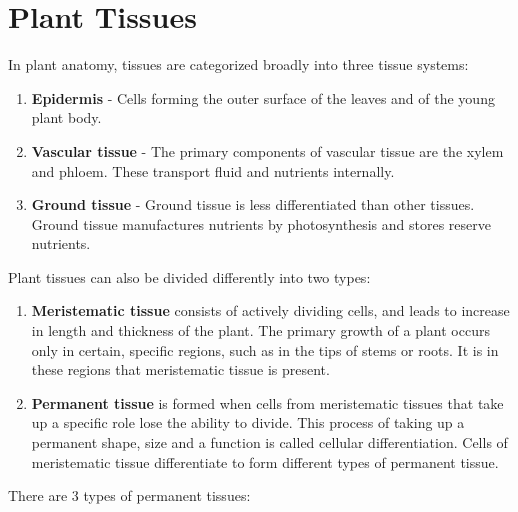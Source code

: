 \section{Plant Tissues}\label{plant-tissues}

In plant anatomy, tissues are categorized broadly into three tissue
systems:

\begin{enumerate}
\def\labelenumi{\arabic{enumi}.}
\tightlist
\item
  \textbf{Epidermis} - Cells forming the outer surface of the leaves and
  of the young plant body.
\item
  \textbf{Vascular tissue} - The primary components of vascular tissue
  are the xylem and phloem. These transport fluid and nutrients
  internally.
\item
  \textbf{Ground tissue} - Ground tissue is less differentiated than
  other tissues. Ground tissue manufactures nutrients by photosynthesis
  and stores reserve nutrients.
\end{enumerate}

Plant tissues can also be divided differently into two types:

\begin{enumerate}
\def\labelenumi{\arabic{enumi}.}
\tightlist
\item
  \textbf{Meristematic tissue} consists of actively dividing cells, and
  leads to increase in length and thickness of the plant. The primary
  growth of a plant occurs only in certain, specific regions, such as in
  the tips of stems or roots. It is in these regions that meristematic
  tissue is present.
\item
  \textbf{Permanent tissue} is formed when cells from meristematic
  tissues that take up a specific role lose the ability to divide. This
  process of taking up a permanent shape, size and a function is called
  cellular differentiation. Cells of meristematic tissue differentiate
  to form different types of permanent tissue.
\end{enumerate}

There are 3 types of permanent tissues:

